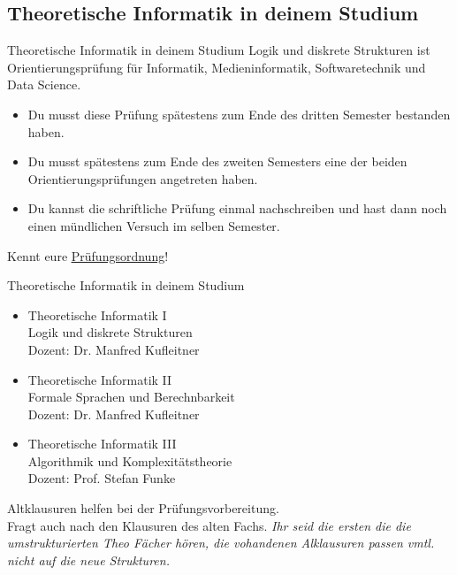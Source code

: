 \subsection{Theoretische Informatik in deinem Studium}
\begin{frame}[fragile]{Theoretische Informatik in deinem Studium}
    Logik und diskrete Strukturen ist Orientierungsprüfung für Informatik, Medieninformatik, Softwaretechnik und Data Science.
    \begin{itemize}
        \item Du musst diese Prüfung spätestens zum Ende des dritten Semester bestanden haben.
        \item Du musst spätestens zum Ende des zweiten Semesters eine der beiden Orientierungsprüfungen angetreten haben.
        \item Du kannst die schriftliche Prüfung einmal nachschreiben und hast dann noch einen mündlichen Versuch im selben Semester.
    \end{itemize}
    \alert{Kennt eure \href{https://www.student.uni-stuttgart.de/pruefungsorganisation/pruefungsordnung/}{\underline{Prüfungsordnung}}!}
\end{frame}

\begin{frame}{Theoretische Informatik in deinem Studium}
    \begin{itemize}
        \item Theoretische Informatik I\\
              Logik und diskrete Strukturen\\
              \quad Dozent: Dr. Manfred Kufleitner
        \item Theoretische Informatik II\\
              Formale Sprachen und Berechnbarkeit\\
              \quad Dozent: Dr. Manfred Kufleitner
        \item Theoretische Informatik III\\
              Algorithmik und Komplexitätstheorie\\
              \quad Dozent: Prof. Stefan Funke
    \end{itemize}
    \alert{Altklausuren helfen bei der Prüfungsvorbereitung. \\Fragt auch nach den Klausuren des alten Fachs.}
    \textit{Ihr seid die ersten die die umstrukturierten Theo Fächer hören, die vohandenen Alklausuren passen vmtl. nicht auf die neue Strukturen.}
\end{frame}


